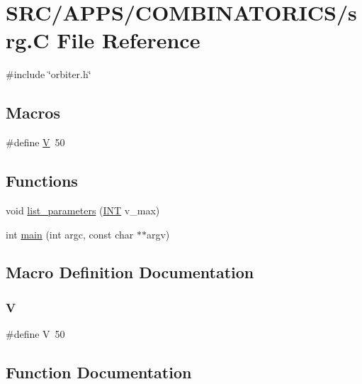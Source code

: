 \hypertarget{srg_8_c}{}\section{S\+R\+C/\+A\+P\+P\+S/\+C\+O\+M\+B\+I\+N\+A\+T\+O\+R\+I\+C\+S/srg.C File Reference}
\label{srg_8_c}
{\ttfamily \#include \char`\"{}orbiter.\+h\char`\"{}}\newline
\subsection*{Macros}
\begin{DoxyCompactItemize}
\item 
\#define \mbox{\hyperlink{srg_8_c_af40a326b23c68a27cebe60f16634a2cb}{V}}~50
\end{DoxyCompactItemize}
\subsection*{Functions}
\begin{DoxyCompactItemize}
\item 
void \mbox{\hyperlink{srg_8_c_acf03bc8dc376b7f46c0b060b9f80a284}{list\+\_\+parameters}} (\mbox{\hyperlink{galois_8h_a09fddde158a3a20bd2dcadb609de11dc}{I\+NT}} v\+\_\+max)
\item 
int \mbox{\hyperlink{srg_8_c_a217dbf8b442f20279ea00b898af96f52}{main}} (int argc, const char $\ast$$\ast$argv)
\end{DoxyCompactItemize}


\subsection{Macro Definition Documentation}
\mbox{\label{srg_8_c_af40a326b23c68a27cebe60f16634a2cb}} 
\subsubsection{\texorpdfstring{V}{V}}
{\footnotesize\ttfamily \#define V~50}



\subsection{Function Documentation}
\mbox{\label{srg_8_c_acf03bc8dc376b7f46c0b060b9f80a284}} 
